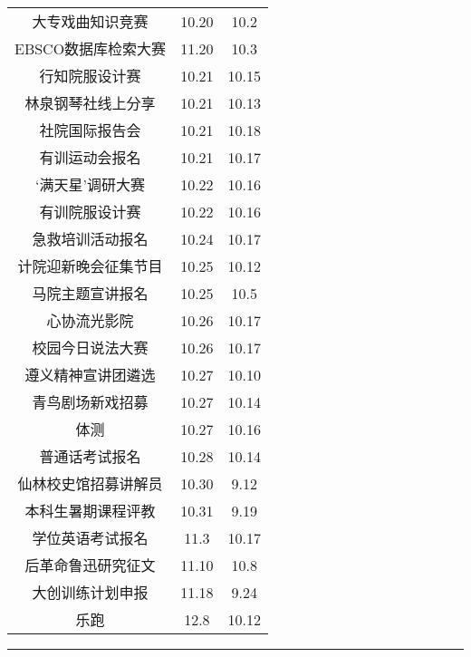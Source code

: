 \documentclass[letterpaper, 12pt]{article}
\begin{document}
\begin{multicols}{2}
{\begin{longtable}{|c|c|c|}
    大专戏曲知识竞赛 & 10.20 & 10.2\\
    EBSCO数据库检索大赛 & 11.20 & 10.3\\
    行知院服设计赛 & 10.21 & 10.15\\
    林泉钢琴社线上分享 & 10.21 & 10.13\\
    社院国际报告会 & 10.21 & 10.18\\
    有训运动会报名 & 10.21 & 10.17\\
     ‘满天星’调研大赛 & 10.22 & 10.16\\
    有训院服设计赛 & 10.22 & 10.16\\
    急救培训活动报名 & 10.24 & 10.17\\
    计院迎新晚会征集节目 & 10.25 & 10.12\\
    马院主题宣讲报名 & 10.25 & 10.5\\
    心协流光影院 & 10.26 & 10.17\\
    校园今日说法大赛 & 10.26 & 10.17\\
    遵义精神宣讲团遴选 & 10.27 & 10.10\\
    青鸟剧场新戏招募 & 10.27 & 10.14\\
    体测 & 10.27 & 10.16\\
    普通话考试报名 & 10.28 & 10.14\\
    仙林校史馆招募讲解员 & 10.30 & 9.12\\
    本科生暑期课程评教 & 10.31 & 9.19\\
    学位英语考试报名 & 11.3 & 10.17\\
    后革命鲁迅研究征文 & 11.10 & 10.8\\
    大创训练计划申报 & 11.18 & 9.24\\
    乐跑 & 12.8 & 10.12\\
    
    \hline
\end{longtable}
\unskip
\unpenalty
\unpenalty}\unvbox\colbbox
\end{multicols}
\hrule
\pagebreak
\end{document}
